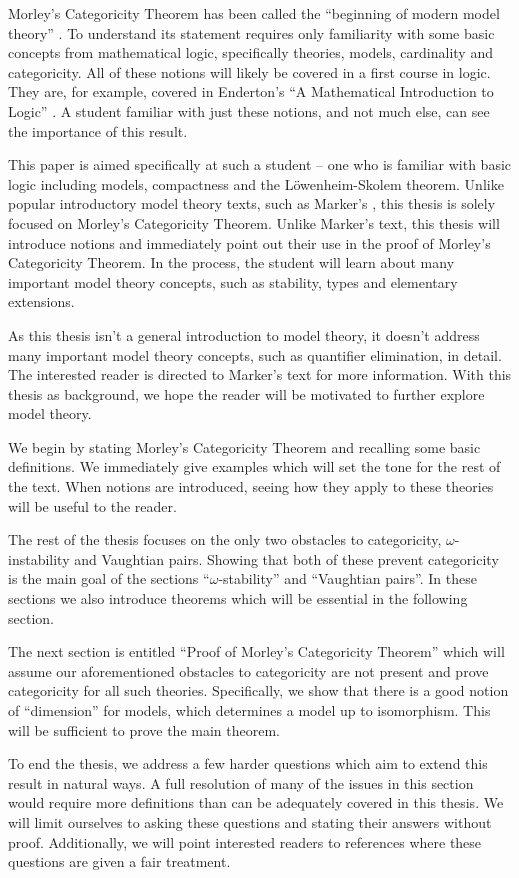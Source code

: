 Morley's Categoricity Theorem has been called the ``beginning of modern model theory'' \cite{mar}. 
To understand its statement requires only familiarity with some basic concepts from mathematical logic, specifically theories, models, cardinality and categoricity. 
All of these notions will likely be covered in a first course in logic.
They are, for example, covered in Enderton's ``A Mathematical Introduction to Logic'' \cite{end}.
A student familiar with just these notions, and not much else, can see the importance of this result.

This paper is aimed specifically at such a student -- one who is familiar with basic logic including models, compactness and the L\"owenheim-Skolem theorem.
Unlike popular introductory model theory texts, such as Marker's \cite{mar},
this thesis is solely focused on Morley's Categoricity Theorem.
Unlike Marker's text, this thesis will introduce notions and immediately point out their use in the proof of Morley's Categoricity Theorem. 
In the process, the student will learn about many important model theory concepts, such as stability, types and elementary extensions. 

As this thesis isn't a general introduction to model theory, it doesn't address many important model theory concepts, such as quantifier elimination, in detail.
The interested reader is directed to Marker's text for more information. 
With this thesis as background, we hope the reader will be motivated to further explore model theory.

We begin by stating Morley's Categoricity Theorem and recalling some basic definitions.
We immediately give examples which will set the tone for the rest of the text. 
When notions are introduced, seeing how they apply to these theories will be useful to the reader. 

The rest of the thesis focuses on the only two obstacles to categoricity, \(\omega\)-instability and Vaughtian pairs. 
Showing that both of these prevent categoricity is the main goal of the sections ``\(\omega\)-stability'' and ``Vaughtian pairs''. 
In these sections we also introduce theorems which will be essential in the following section.

The next section is entitled ``Proof of Morley's Categoricity Theorem'' which will assume our aforementioned obstacles to categoricity are not present and prove categoricity for all such theories. 
Specifically, we show that there is a good notion of ``dimension'' for models, which determines a model up to isomorphism. 
This will be sufficient to prove the main theorem.

To end the thesis, we address a few harder questions which aim to extend this result in natural ways. 
A full resolution of many of the issues in this section would require more definitions than can be adequately covered in this thesis. 
We will limit ourselves to asking these questions and stating their answers without proof. 
Additionally, we will point interested readers to references where these questions are given a fair treatment. 
